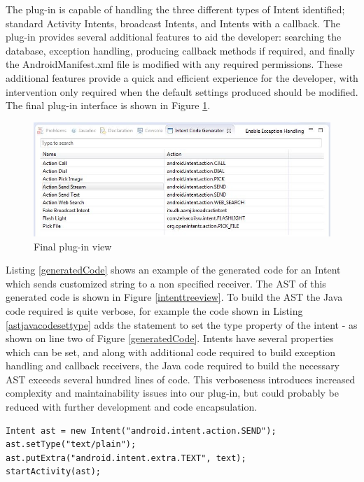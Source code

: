 The plug-in is capable of handling the three different types of Intent identified; standard Activity Intents, broadcast Intents, and Intents with a callback. The plug-in provides several additional features to aid the developer: searching the database, exception handling, producing callback methods if required, and finally the AndroidManifest.xml file is modified with any required permissions. These additional features provide a quick and efficient experience for the developer, with intervention only required when the default settings produced should be modified. The final plug-in interface is shown in Figure \ref{codegeneratorview}.

\begin{figure}[t]
  \centering
    \includegraphics[width=\textwidth]{codegenerator}
  \caption{Final plug-in view}
\label{codegeneratorview}
\end{figure}

Listing \ref{generatedCode} shows an example of the generated code for an Intent which sends customized string to a non specified receiver. The AST of this generated code is shown in Figure \ref{intenttreeview}. To build the AST the Java code required is quite verbose, for example the code shown in Listing \ref{astjavacodesettype} adds the statement to set the type property of the intent - as shown on line two of Figure \ref{generatedCode}. Intents have several properties which can be set, and along with additional code required to build exception handling and callback receivers, the Java code required to build the necessary AST exceeds several hundred lines of code. This verboseness introduces increased complexity and maintainability issues into our plug-in, but could probably be reduced with further development and code encapsulation.

{\footnotesize\begin{lstlisting}[label=generatedCode,caption=Generated code of an Intent]
Intent ast = new Intent("android.intent.action.SEND");
ast.setType("text/plain");
ast.putExtra("android.intent.extra.TEXT", text);
startActivity(ast);		
\end{lstlisting}}

